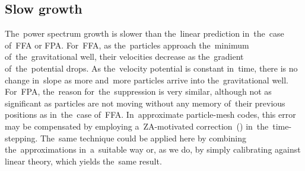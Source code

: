\subsection{Slow growth}
\label{sec:z_eff}
The~power spectrum growth is slower than the~linear prediction in~the~case of~FFA or FPA. For~FFA, as the~particles approach the~minimum of~the~gravitational well, their velocities decrease as the~gradient of~the~potential drops. As the~velocity potential is constant in~time, there is no change in~slope as more and~more particles arrive into the~gravitational well. For~FPA, the~reason for~the~suppression is very similar, although not as significant as particles are not moving without any memory of~their previous positions as in~the~case of~FFA. In~approximate particle-mesh codes, this error may be compensated by employing a~ZA-motivated correction~(\cite{Ref:Feng}) in~the~time-stepping. The~same technique could be applied here by combining the~approximations in~a~suitable way or, as we do, by simply calibrating against linear theory, which yields the~same result.





